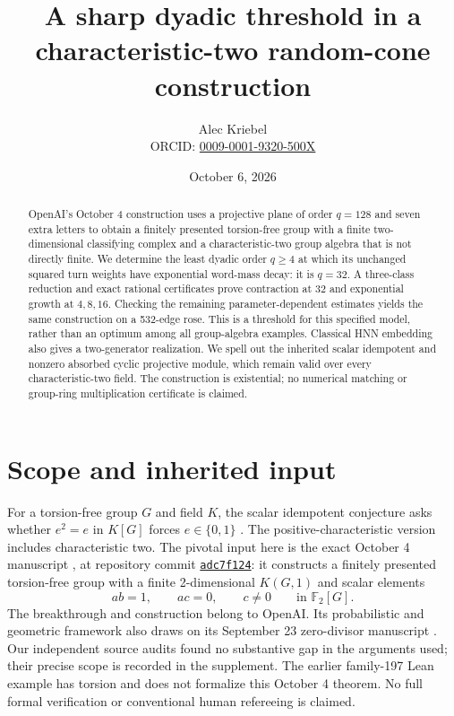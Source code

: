 \documentclass[11pt]{article}
\title{A sharp dyadic threshold in a\\characteristic-two random-cone construction}
\author{Alec Kriebel\\\small ORCID: \href{https://orcid.org/0009-0001-9320-500X}{0009-0001-9320-500X}}
\date{October 6, 2026}
\newcommand{\Ftwo}{\mathbb F_2}
\begin{document}
\maketitle
\begin{abstract}
OpenAI's October 4 construction uses a projective plane of order
$q=128$ and seven extra letters to obtain a finitely presented torsion-free
group with a finite two-dimensional classifying complex and a
characteristic-two group algebra that is not directly finite.
We determine the least dyadic order $q\ge4$ at which its unchanged squared
turn weights have exponential word-mass decay: it is $q=32$.
A three-class reduction and exact rational certificates prove contraction
at $32$ and exponential growth at $4,8,16$. Checking the remaining
parameter-dependent estimates yields the same construction on a
532-edge rose. This is a threshold for this specified model, rather than
an optimum among all group-algebra examples. Classical HNN embedding
also gives a two-generator realization. We spell out the inherited
scalar idempotent and nonzero absorbed cyclic projective module, which
remain valid over every characteristic-two field. The construction is
existential; no numerical matching or group-ring multiplication
certificate is claimed.
\end{abstract}

\section{Scope and inherited input}
For a torsion-free group $G$ and field $K$, the scalar idempotent
conjecture asks whether $e^2=e$ in $K[G]$ forces $e\in\{0,1\}$
\cite[Problem 1(c)]{Oinert}. The positive-characteristic version includes
characteristic two. The pivotal input here is the exact October 4
manuscript \cite[Theorem 1.1]{OpenAI}, at repository commit
\href{https://github.com/openai/math/tree/adc7f1241b42e322a6451854ab7e4b4c146bf78a}{\texttt{adc7f124}}:
it constructs a finitely presented torsion-free group with a finite
2-dimensional $K(G,1)$ and scalar elements
\begin{equation}\label{eq:input}
ab=1,\qquad ac=0,\qquad c\ne0\qquad\text{in }\Ftwo[G].
\end{equation}
The breakthrough and construction belong to OpenAI. Its probabilistic
and geometric framework also draws on its September 23 zero-divisor
manuscript \cite{OpenAIZD}. Our independent source audits found no
substantive gap in the arguments used; their precise scope is recorded
in the supplement. The earlier family-197 Lean example has torsion and
does not formalize this October 4 theorem. No full formal verification
or conventional human refereeing is claimed.
\end{document}
